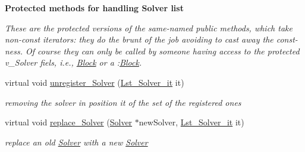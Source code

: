 \begin{Indent}\textbf{ Protected methods for handling Solver list}\par
{\em These are the protected versions of the same-\/named public methods, which take non-\/const iterators\+: they do the brunt of the job avoiding to cast away the const-\/ness. Of course they can only be called by someone having access to the protected v\+\_\+\+Solver fiels, i.\+e., \mbox{\hyperlink{class_s_m_spp__di__unipi__it_1_1_block}{Block}} or a \+:\mbox{\hyperlink{class_s_m_spp__di__unipi__it_1_1_block}{Block}}. }\begin{DoxyCompactItemize}
\item 
\mbox{\label{class_s_m_spp__di__unipi__it_1_1_block_a38f3a6d79934bab8b4c6a5cc5f7fd08c}} 
virtual void \mbox{\hyperlink{class_s_m_spp__di__unipi__it_1_1_block_a38f3a6d79934bab8b4c6a5cc5f7fd08c}{unregister\+\_\+\+Solver}} (\mbox{\hyperlink{namespace_s_m_spp__di__unipi__it_a85296b49530637d43914dc63b7d6862d}{Lst\+\_\+\+Solver\+\_\+it}} it)
\begin{DoxyCompactList}\small\item\em removing the solver in position it of the set of the registered ones \end{DoxyCompactList}\item 
\mbox{\label{class_s_m_spp__di__unipi__it_1_1_block_a44b23985558e9835625b58bd075fc7e3}} 
virtual void \mbox{\hyperlink{class_s_m_spp__di__unipi__it_1_1_block_a44b23985558e9835625b58bd075fc7e3}{replace\+\_\+\+Solver}} (\mbox{\hyperlink{class_s_m_spp__di__unipi__it_1_1_solver}{Solver}} $\ast$new\+Solver, \mbox{\hyperlink{namespace_s_m_spp__di__unipi__it_a85296b49530637d43914dc63b7d6862d}{Lst\+\_\+\+Solver\+\_\+it}} it)
\begin{DoxyCompactList}\small\item\em replace an old \mbox{\hyperlink{class_s_m_spp__di__unipi__it_1_1_solver}{Solver}} with a new \mbox{\hyperlink{class_s_m_spp__di__unipi__it_1_1_solver}{Solver}} \end{DoxyCompactList}\end{DoxyCompactItemize}
\end{Indent}
